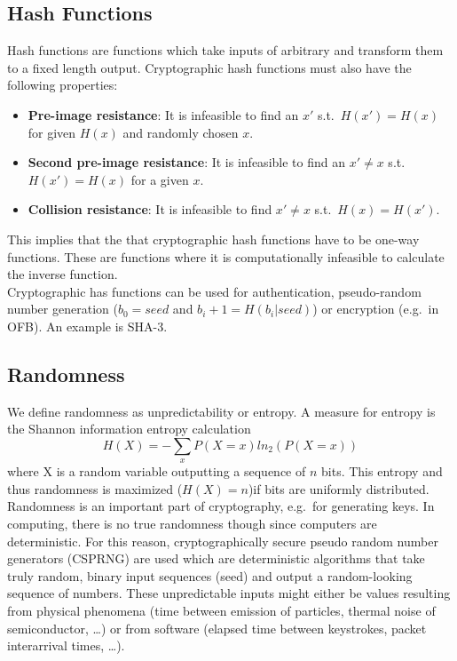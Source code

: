\subsection{Hash Functions}
Hash functions are functions which take inputs of arbitrary and transform them to a fixed length output.
Cryptographic hash functions must also have the following properties:
\begin{itemize}
  \item \textbf{Pre-image resistance}: It is infeasible to find an $x'$ s.t.\ $H(x') = H(x)$ for given $H(x)$ and randomly chosen $x$.
  \item \textbf{Second pre-image resistance}: It is infeasible to find an $x' \neq x$ s.t.\ $H(x') = H(x)$ for a given $x$.
  \item \textbf{Collision resistance}: It is infeasible to find $x' \neq x$ s.t.\ $H(x) = H(x')$.
\end{itemize}
This implies that the that cryptographic hash functions have to be one-way functions.
These are functions where it is computationally infeasible to calculate the inverse function.\\

Cryptographic has functions can be used for authentication, pseudo-random number generation ($b_0 = seed$ and $b_i+1 = H(b_i|seed)$) or encryption (e.g.\ in OFB).
An example is SHA-3.

\subsection{Randomness}
We define randomness as unpredictability or entropy.
A measure for entropy is the Shannon information entropy calculation
\begin{equation*}
  H(X) = - \sum_x P(X = x)ln_2(P(X=x))
\end{equation*}
where X is a random variable outputting a sequence of $n$ bits.
This entropy and thus randomness is maximized ($H(X) = n$)if bits are uniformly distributed.\\

Randomness is an important part of cryptography, e.g.\ for generating keys.
In computing, there is no true randomness though since computers are deterministic.
For this reason, cryptographically secure pseudo random number generators (CSPRNG) are used which are deterministic algorithms that take truly random, binary input sequences (seed) and output a random-looking sequence of numbers.
These unpredictable inputs might either be values resulting from physical phenomena (time between emission of particles, thermal noise of semiconductor, \dots) or from software (elapsed time between keystrokes, packet interarrival times, \dots).



